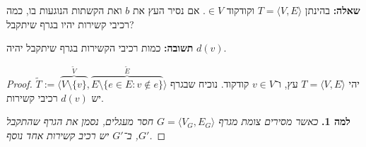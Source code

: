 \documentclass[]{article}
\newcommand\ra    {\rangle}
\newcommand\la    {\langle}
\newcommand\tl    {\tilde}
\begin{document}
	\section{}
	\textbf{שאלה: }בהינתן $T = \la V, E \ra$ וקודקוד $ \in V$. אם נסיר העץ את $b$ ואת הקשתות הנוגעות בו, כמה רכיבי קשירות יהיו בגרף שיתקבל? 
	
	\textbf{תשובה: }כמות רכיבי הקשירות בגרף שיתקבל יהיה $d(v)$. 
	
	\begin{proof}
		יהי $T = \la V, E \ra$ עץ, ו־$v \in V$ קודקוד. נוכיח שבגרף $\tl T := \la \overbrace{V \setminus \{v\}}^{\tl V}, \overbrace{E \setminus \{e \in E \colon v \notin e\}}^{\tl E} \ra$ יש $d(v)$ רכיבי קשירות. 
		
		\textbf{למה 1. }\textit{כאשר מסירים צומת מגרף $G = \la V_G, E_G \ra$ חסר מעגלים, נסמן את הגרף שהתקבל $G'$, ב־$G'$ יש רכיב קשירות אחד נוסף.}
		

\end{proof}
\end{document}
